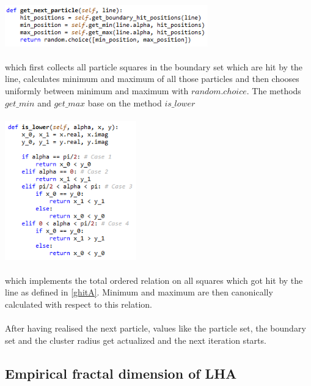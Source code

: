 \documentclass[12pt,a4paper]{scrartcl}
\numberwithin{equation}{subsection}
\newcommand{\1}{\mathbbm{1}}
\numberwithin{equation}{section}
\theoremstyle{definition}
\begin{document}
\\
\includegraphics[height=1.8cm]{images/code-snippets/nextparticle.png} \\
\\
which first collects all particle squares in the boundary set which are hit by the line, calculates minimum and maximum of all those particles and then chooses uniformly between minimum and maximum with $\mathit{random.choice}$. The methods $\mathit{get\_min}$ and $\mathit{get\_max}$ base on the method $\mathit{is\_lower}$\\
\\
\includegraphics[height=6cm]{images/code-snippets/islower.png} \\
\\
which implements the total ordered relation on all squares which got hit by the line as defined in \ref{ghitA}. Minimum and maximum are then canonically calculated with respect to this relation. \\
\\After having realised the next particle, values like the particle set, the boundary set and the cluster radius get actualized and the next iteration starts.


\subsection{Empirical fractal dimension of LHA}
\end{document}
